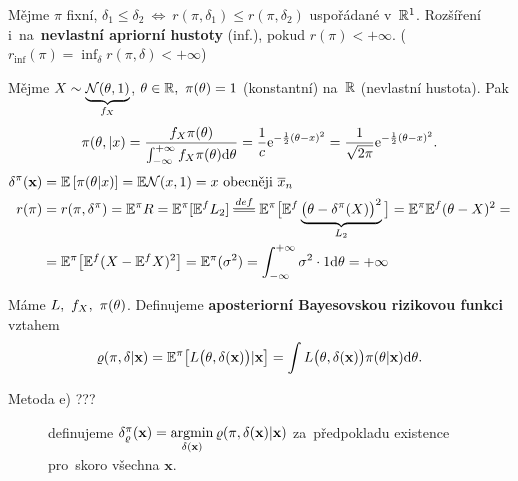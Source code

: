 \begin{remark}
	Mějme $\pi$ fixní, $\delta_1\leq\delta_2~\Leftrightarrow~r(\pi,\delta_1)\leq r(\pi,\delta_2)$ uspořádané v~$\mathbb{R}^1$. Rozšíření i~na~\textbf{nevlastní apriorní hustoty} (inf.), pokud $r(\pi)<+\infty$. ($r_\text{inf}(\pi)=\inf_\delta r(\pi,\delta)<+\infty$)
\end{remark}
\begin{example}
	Mějme $X\sim\underbrace{\mathcal{N}(\theta,1)}_{f_X}$, $\theta\in\mathbb{R},~\pi(\theta)=1$ (konstantní) na~$\mathbb{R}$ (nevlastní hustota). Pak
	$$ \pi(\theta,|x)=\frac{f_X \pi(\theta)}{\int_{-\infty}^{+\infty}f_X \pi(\theta)\mathrm{d}\theta}=\frac{1}{c}\mathrm{e}^{-\frac{1}{2}(\theta-x)^2}=\frac{1}{\sqrt{2\pi}}\mathrm{e}^{-\frac{1}{2}(\theta-x)^2}.$$
	\[\begin{split}
	\delta^\pi(\textbf{x})&=\EE{\pi(\t|x)}=\E\NN(x,1)=x\text{ obecněji }\overline{x}_n\\
	r(\pi)&= r(\pi,\delta^\pi)=\E^\pi R=\E^\pi[\E^f L_2]\equal{def}\E^\pi\big[ \E^f\underbrace{\big(\t-\delta^\pi(X) \big)^2}_{L_2} \big]=\E^\pi\E^f(\t-X)^2=\\&=\E^\pi\big[ \E^f(X-\E^fX)^2 \big]=\E^\pi(\sigma^2)=\int_{-\infty}^{+\infty}\sigma^2\cdot 1\d\t=+\infty
	\end{split}
	\]
\end{example}
\begin{define}
	Máme $L,~f_X,~\pi(\theta)$. Definujeme \textbf{aposteriorní Bayesovskou rizikovou funkci} vztahem
	$$ \varrho(\pi,\delta|\textbf{x})=\mathbb{E}^\pi\big[ L\big(\theta,\delta(\textbf{x})\big)|\textbf{x} \big]=\int L\big(\theta,\delta(\textbf{x})\big)\pi(\theta|\textbf{x})\mathrm{d}\theta.$$ 
\end{define}

\begin{description}
	\item[Metoda e) ???] definujeme $\delta_\varrho^\pi(\textbf{x})=\mathop{\mathrm{argmin}}\limits_{\delta(\textbf{x})}\varrho(\pi,\delta(\textbf{x})|\textbf{x})$ za~předpokladu existence pro~skoro všechna $\textbf{x}$.
\end{description}

